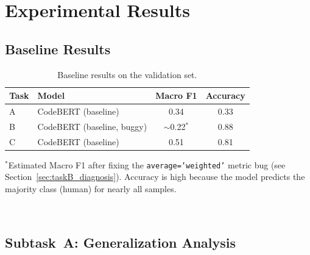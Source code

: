 \documentclass[11pt]{article}
\begin{document}
\section{Experimental Results}
\label{sec:results}

\subsection{Baseline Results}

\begin{table}[ht]
\centering
\small
\begin{tabularx}{\columnwidth}{@{}l X c c@{}}
\toprule
\textbf{Task} & \textbf{Model} & \textbf{Macro F1} & \textbf{Accuracy} \\ \midrule
A & CodeBERT (baseline) & 0.34 & 0.33 \\
B & CodeBERT (baseline, buggy) & $\sim$0.22$^*$ & 0.88 \\
C & CodeBERT (baseline) & 0.51 & 0.81 \\
\bottomrule
\end{tabularx}
\begin{minipage}{\columnwidth}
\small $^*$Estimated Macro F1 after fixing the \texttt{average='weighted'} metric bug (see Section~\ref{sec:taskB_diagnosis}). Accuracy is high because the model predicts the majority class (human) for nearly all samples.\\
\end{minipage}
\caption{Baseline results on the validation set.}
\label{tab:baseline_results}
\end{table}
\
\subsection{Subtask~A: Generalization Analysis}
\end{document}
